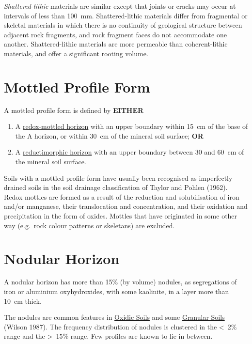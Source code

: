 \documentclass[
  letterpaper,
  DIV=11,
  numbers=noendperiod]{scrreprt}
\providecommand{\tightlist}{%
  \setlength{\itemsep}{0pt}\setlength{\parskip}{0pt}}\usepackage{longtable,booktabs,array}
\begin{document}
\emph{Shattered-lithic} materials are similar except that joints or
cracks may occur at intervals of less than 100~mm. Shattered-lithic
materials differ from fragmental or skeletal materials in which there is
no continuity of geological structure between adjacent rock fragments,
and rock fragment faces do not accommodate one another. Shattered-lithic
materials are more permeable than coherent-lithic materials, and offer a
significant rooting volume.

\hypertarget{sec-diag-mottpf}{%
\section{Mottled Profile Form}\label{sec-diag-mottpf}}

A mottled profile form is defined by \textbf{EITHER}

\begin{enumerate}
\def\labelenumi{\arabic{enumi}.}
\tightlist
\item
  A \protect\hyperlink{sec-diag-roxh}{redox-mottled horizon} with an
  upper boundary within 15~cm of the base of the A horizon, or within
  30~cm of the mineral soil surface; \textbf{OR}
\item
  A \protect\hyperlink{sec-diag-redmh}{reductimorphic horizon} with an
  upper boundary between 30 and 60~cm of the mineral soil surface.
\end{enumerate}

Soils with a mottled profile form have usually been recognised as
imperfectly drained soils in the soil drainage classification of Taylor
and Pohlen (1962). Redox mottles are formed as a result of the reduction
and solubilisation of iron and/or manganese, their translocation and
concentration, and their oxidation and precipitation in the form of
oxides. Mottles that have originated in some other way (e.g.~rock colour
patterns or skeletans) are excluded.

\hypertarget{sec-diag-nodh}{%
\section{Nodular Horizon}\label{sec-diag-nodh}}

A nodular horizon has more than 15\% (by volume) nodules, as
segregations of iron or aluminium oxyhydroxides, with some kaolinite, in
a layer more than 10~cm thick.

The nodules are common features in \protect\hyperlink{sec-ord-X}{Oxidic
Soils} and some \protect\hyperlink{sec-ord-N}{Granular Soils} (Wilson
1987). The frequency distribution of nodules is clustered in the
\textless~2\% range and the \textgreater~15\% range. Few profiles are
known to lie in between.
\end{document}
